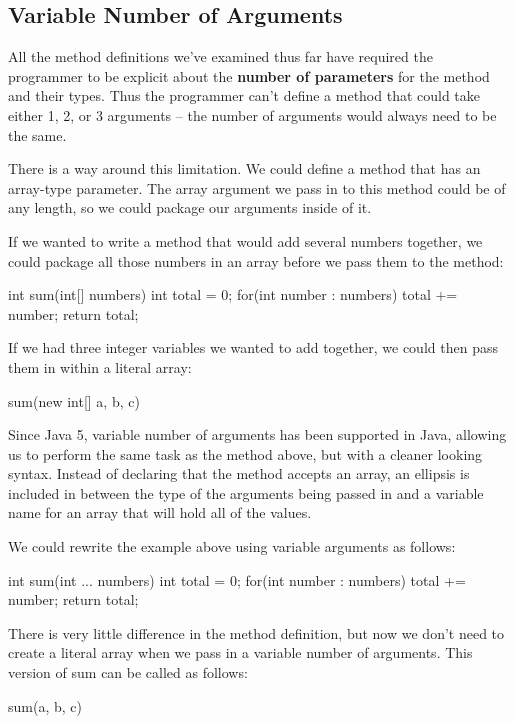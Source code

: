 \subsection{Variable Number of Arguments}

All the method definitions we've examined thus far have required the programmer to be explicit about the \textbf{number of parameters} for the method and their types. Thus the programmer can't define a method that could take either 1, 2, or 3 arguments -- the number of arguments would always need to be the same. 

There is a way around this limitation. We could define a method that has an array-type parameter. The array argument we pass in to this method could be of any length, so we could package our arguments inside of it.

\begin{exa}
If we wanted to write a method that would add several numbers together, we could package all those numbers in an array before we pass them to the method:

\begin{code}
int sum(int[] numbers) {
  int total = 0;
  for(int number : numbers) {
    total += number;
  }
  return total;
}
\end{code}

If we had three integer variables we wanted to add together, we could then pass them in within a literal array:

\begin{code}
sum(new int[] {a, b, c})
\end{code}

\end{exa}

Since Java 5, variable number of arguments has been supported in Java, allowing us to perform the same task as the method above, but with a cleaner looking syntax. Instead of declaring that the method accepts an array, an ellipsis is included in between the type of the arguments being passed in and a variable name for an array that will hold all of the values. 

\begin{exa}
We could rewrite the example above using variable arguments as follows:

\begin{code}
int sum(int ... numbers) {
  int total = 0;
  for(int number : numbers) {
    total += number;
  }
  return total;
}
\end{code}

There is very little difference in the method definition, but now we don't need to create a literal array when we pass in a variable number of arguments. This version of sum can be called as follows:

\begin{code}
sum(a, b, c)
\end{code}
\end{exa}


